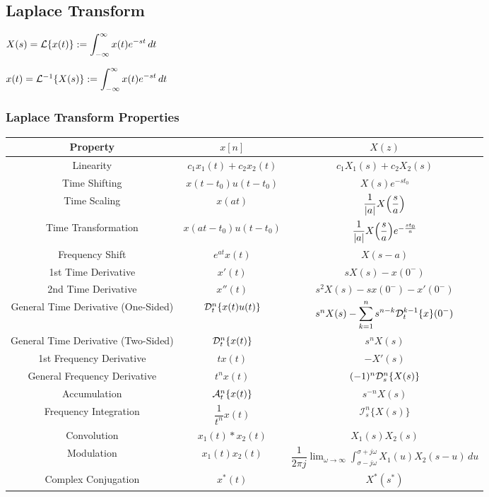 \documentclass[11pt]{article}
\begin{document}
  \pagebreak

  \subsection{Laplace Transform}

  \begin{multicols}{2}
		\(X(s) = \mathcal{L}\{x(t)\} := \displaystyle \int_{-\infty}^{\infty} x(t)e^{-st}\, dt\)

    \columnbreak

		\(x(t) = \mathcal{L}^{-1}\{X(s)\} := \displaystyle \int_{-\infty}^{\infty} x(t)e^{-st}\, dt\)
  \end{multicols}

  \subsubsection{Laplace Transform Properties}

  \bgroup
  \renewcommand{\arraystretch}{1.8}
  \setlength{\tabcolsep}{0.2cm}
  \normalsize\begin{tabular}{c|c|c}
    Property & \(x[n]\) & \(X(z)\) \\
    \hline
    Linearity & \(c_1x_1(t) + c_2x_2(t)\) & \(c_1X_1(s) + c_2X_2(s)\) \\
    Time Shifting & \(x(t - t_0)u(t - t_0)\) & \(X(s)e^{-st_0}\) \\
    Time Scaling & \(x(at)\) & \(\dfrac{1}{|a|}X{\left( \dfrac{s}{a} \right)}\) \\
    Time Transformation & \(x(at - t_0)u(t - t_0)\) & \(\dfrac{1}{|a|}X{\left( \dfrac{s}{a} \right)}e^{-\frac{st_0}{a}}\) \\
    Frequency Shift & \(e^{at}x(t)\) & \(X(s - a)\) \\
    1st Time Derivative & \(x'(t)\) & \(sX(s) - x(0^-)\) \\
    2nd Time Derivative & \(x''(t)\) & \(s^2X(s) - sx(0^-) - x'(0^-)\) \\
    General Time Derivative (One-Sided) &
    \(\mathcal{D}_t^n\{x(t)u(t)\}\) & \(s^nX(s) - \displaystyle \sum_{k = 1}^{n} s^{n - k}\mathcal{D}_t^{k -1}\{x\}(0^-)\) \\
    General Time Derivative (Two-Sided) &
    \(\mathcal{D}_t^n\{x(t)\}\) & \(s^nX(s)\) \\
    1st Frequency Derivative & \(tx(t)\) & \(-X'(s)\) \\
    General Frequency Derivative & \(t^nx(t)\) & \((-1)^n\mathcal{D}^n_s\{X(s)\}\) \\
    Accumulation & \(\mathcal{A}^n_t\{x(t)\}\) & \(s^{-n}X(s)\) \\
    Frequency Integration & \(\dfrac{1}{t^n}x(t)\) & \(\mathcal{I}^n_{s}\{X(s)\}\) \\
    Convolution & \(x_1(t) * x_2(t)\) & \(X_1(s)X_2(s)\) \\
    Modulation & \(x_1(t)x_2(t)\) & \(\dfrac{1}{2\pi j}
    \displaystyle \lim_{\omega \to \infty}\int_{\sigma - j\omega}^{\sigma + j\omega} X_1(u)X_2(s - u)\,du\) \\
    Complex Conjugation & \(x^*(t)\) & \(X^*(s^*)\) \\
  \end{tabular}
  \egroup
\end{document}
